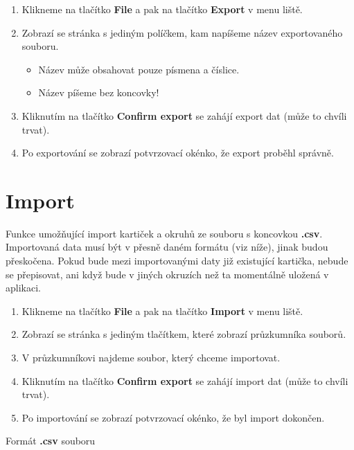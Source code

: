 \documentclass[12pt]{article}
\providecommand{\tightlist}{\setlength{\itemsep}{1pt}\setlength{\parskip}{1pt}}
\begin{document}
\begin{enumerate}
\def\labelenumi{\arabic{enumi}.}
\tightlist
\item
  Klikneme na tlačítko \textbf{File} a pak na tlačítko \textbf{Export} v
  menu liště.
\item
  Zobrazí se stránka s jediným políčkem, kam napíšeme název
  exportovaného souboru.

  \begin{itemize}
  \tightlist
  \item
    Název může obsahovat pouze písmena a číslice.
  \item
    Název píšeme bez koncovky!
  \end{itemize}
\item
  Kliknutím na tlačítko \textbf{Confirm export} se zahájí export dat
  (může to chvíli trvat).
\item
  Po exportování se zobrazí potvrzovací okénko, že export proběhl
  správně.
\end{enumerate}

\hypertarget{import}{%
\section{Import}\label{import}}

Funkce umožňující import kartiček a okruhů ze souboru s koncovkou
\textbf{.csv}. Importovaná data musí být v přesně daném formátu (viz
níže), jinak budou přeskočena. Pokud bude mezi importovanými daty již
existující kartička, nebude se přepisovat, ani když bude v jiných
okruzích než ta momentálně uložená v aplikaci.

\begin{enumerate}
\def\labelenumi{\arabic{enumi}.}
\tightlist
\item
  Klikneme na tlačítko \textbf{File} a pak na tlačítko \textbf{Import} v
  menu liště.
\item
  Zobrazí se stránka s jediným tlačítkem, které zobrazí průzkumníka
  souborů.
\item
  V průzkumníkovi najdeme soubor, který chceme importovat.
\item
  Kliknutím na tlačítko \textbf{Confirm export} se zahájí import dat
  (může to chvíli trvat).
\item
  Po importování se zobrazí potvrzovací okénko, že byl import dokončen.
\end{enumerate}

Formát \textbf{.csv} souboru
\end{document}
